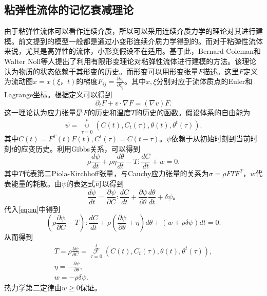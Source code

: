 \documentclass{article}
\begin{document}
\subsection{粘弹性流体的记忆衰减理论}
由于粘弹性流体可以看作连续介质，所以可以采用连续介质力学的理论对其进行建模。前文提到的模型一般都是通过小变形连续介质力学得到的。而对于粘弹性流体来说，尤其是高弹性的流体，小形变假设不在适用。基于此，Bernard Coleman和Walter Noll等人提出了利用有限形变理论对粘弹性流体进行建模的方法\cite{coleman1961foundations,coleman1964thermodynamics,coleman2012viscometric}。该理论认为物质的状态依赖于其形变的历史。而形变可以用形变张量$F$描述。这里$F$定义为流动图$x = x(\xi，t)$的梯度$F_{ij} = \frac{\partial x_i}{\partial \xi_j}$。其中$x,\xi$分别对应于流体质点的Euler和Lagrange坐标。根据定义可以得到
\begin{equation}\label{eq:Feq}
	\partial_t F + v \cdot \nabla F = (\nabla v) F.
\end{equation}
这一理论认为应力张量是$F$的历史和温度$T$的历史的函数。假设体系的自由能为
\begin{equation*}
	\psi = \mathop{\psi} \limits_{\tau=0}^{t}( C(t), C_t(\tau),\theta(t),\theta^t(\tau)).
\end{equation*}
其中$C(t) = F^T(t) F(t),C^t(\tau) = C(t - \tau)$。$\psi$依赖于从初始时刻到当前时刻$t$的应变历史。利用Gibbs关系，可以得到
\begin{equation}\label{eq:en}
	\rho \frac{d\psi}{dt} + \rho \eta \frac{d \theta}{dt} - T: \frac{dC}{dt} + w = 0.
\end{equation}
其中$T$代表第二Piola-Kirchhoff张量，与Cauchy应力张量的关系为$\sigma = \rho F T F^T$，$w$代表能量的耗散。由$\psi$的表达式可以得到
\begin{equation*}
	\frac{d\psi}{dt} = \frac{\partial \psi}{\partial C} : \frac{d C}{dt}+ \frac{\partial \psi}{\partial \theta} \frac{d\theta}{dt} + \delta \psi。
\end{equation*}
代入\eqref{eq:en}中得到
\begin{equation*}
	(\rho \frac{\partial \psi}{\partial C} - T) : \frac{dC}{dt} + \rho (\frac{\partial \psi}{\partial \theta} + \eta) d\theta + (w + \rho \delta \psi) dt  =0.
\end{equation*}
从而得到
\begin{eqnarray*}
	T = \rho \frac{\partial \psi}{\partial C} = \mathop{\mathcal{F}}\limits_{\tau=0}^{t} ( C(t), C_t(\tau),\theta(t),\theta^t(\tau)), \\
	\eta = -\frac{\partial \psi}{\partial \theta},\\
	w = -\rho \delta \psi.
\end{eqnarray*}
热力学第二定律由$w \ge 0$保证\cite{coleman1961foundations,dimitrienko2010nonlinear}。
\end{document}

